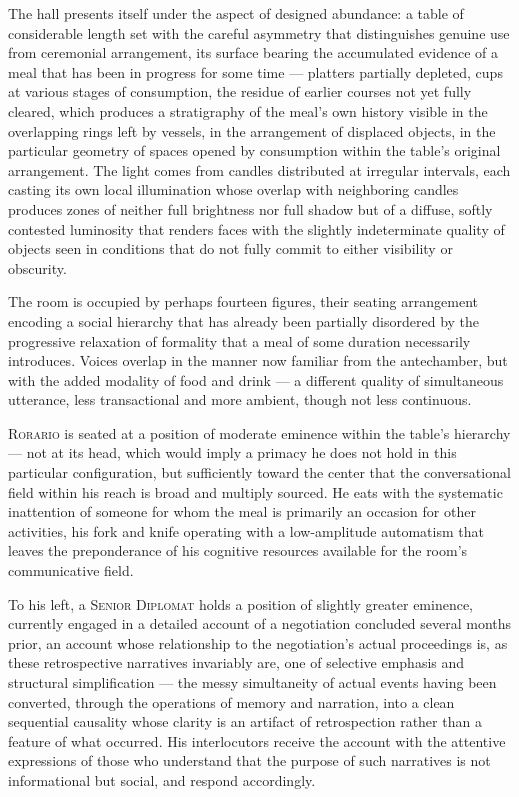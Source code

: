 \documentclass[12pt, oneside]{article}
\newenvironment{action}{%
  \vspace{0.6em}%
  \noindent\ignorespaces%
}{%
  \par\vspace{0.6em}%
}
\begin{document}
\begin{action}
The hall presents itself under the aspect of designed abundance: a table of considerable length set with the careful asymmetry that distinguishes genuine use from ceremonial arrangement, its surface bearing the accumulated evidence of a meal that has been in progress for some time --- platters partially depleted, cups at various stages of consumption, the residue of earlier courses not yet fully cleared, which produces a stratigraphy of the meal's own history visible in the overlapping rings left by vessels, in the arrangement of displaced objects, in the particular geometry of spaces opened by consumption within the table's original arrangement. The light comes from candles distributed at irregular intervals, each casting its own local illumination whose overlap with neighboring candles produces zones of neither full brightness nor full shadow but of a diffuse, softly contested luminosity that renders faces with the slightly indeterminate quality of objects seen in conditions that do not fully commit to either visibility or obscurity.

The room is occupied by perhaps fourteen figures, their seating arrangement encoding a social hierarchy that has already been partially disordered by the progressive relaxation of formality that a meal of some duration necessarily introduces. Voices overlap in the manner now familiar from the antechamber, but with the added modality of food and drink --- a different quality of simultaneous utterance, less transactional and more ambient, though not less continuous.
\end{action}

\begin{action}
\textsc{Rorario} is seated at a position of moderate eminence within the table's hierarchy --- not at its head, which would imply a primacy he does not hold in this particular configuration, but sufficiently toward the center that the conversational field within his reach is broad and multiply sourced. He eats with the systematic inattention of someone for whom the meal is primarily an occasion for other activities, his fork and knife operating with a low-amplitude automatism that leaves the preponderance of his cognitive resources available for the room's communicative field.

To his left, a \textsc{Senior Diplomat} holds a position of slightly greater eminence, currently engaged in a detailed account of a negotiation concluded several months prior, an account whose relationship to the negotiation's actual proceedings is, as these retrospective narratives invariably are, one of selective emphasis and structural simplification --- the messy simultaneity of actual events having been converted, through the operations of memory and narration, into a clean sequential causality whose clarity is an artifact of retrospection rather than a feature of what occurred. His interlocutors receive the account with the attentive expressions of those who understand that the purpose of such narratives is not informational but social, and respond accordingly.
\end{action}
\end{document}
